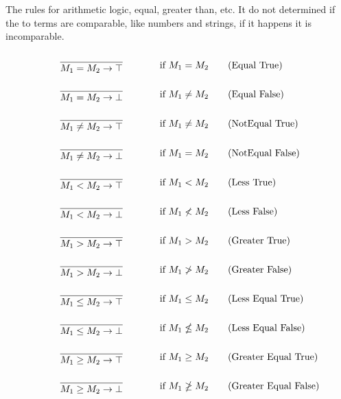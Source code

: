 The rules for arithmetic logic, equal, greater than, etc. It do not determined if the to terms are comparable, like numbers and strings, if it happens it is incomparable.




\begin{align*}
    \infrule{}{M_1 = M_2 \ra \top}& \text{if }M_1=M_2 \tag{Equal True}\\
    \infrule{}{M_1 = M_2 \ra \bot}& \text{if }M_1\neq M_2 \tag{Equal False}\\
    \infrule{}{M_1 \neq M_2 \ra \top}& \text{if }M_1\neq M_2 \tag{NotEqual True}\\
    \infrule{}{M_1 \neq M_2 \ra \bot}& \text{if }M_1= M_2 \tag{NotEqual False}\\
    \infrule{}{M_1 < M_2 \ra \top}& \text{if }M_1<M_2 \tag{Less True}\\
    \infrule{}{M_1 < M_2 \ra \bot}& \text{if }M_1\nless M_2 \tag{Less False}\\
    \infrule{}{M_1 > M_2 \ra \top}& \text{if }M_1>M_2 \tag{Greater True}\\
    \infrule{}{M_1 > M_2 \ra \bot}& \text{if }M_1\ngtr M_2 \tag{Greater False}\\
    \infrule{}{M_1 \leq M_2 \ra \top}& \text{if }M_1\leq M_2 \tag{Less Equal True}\\
    \infrule{}{M_1 \leq M_2 \ra \bot}& \text{if }M_1\nleq M_2 \tag{Less Equal False}\\
    \infrule{}{M_1 \geq M_2 \ra \top}& \text{if }M_1\geq M_2 \tag{Greater Equal True}\\
    \infrule{}{M_1 \geq M_2 \ra \bot}& \text{if }M_1\ngeq M_2 \tag{Greater Equal False}
\end{align*}


\FloatBarrier



